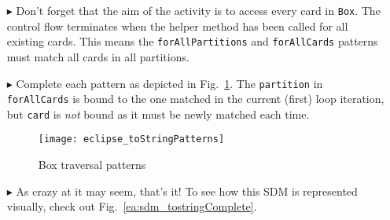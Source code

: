 \begin{itemize}
\item[$\blacktriangleright$] Don't forget that the aim of the activity is to access every card in \texttt{Box}. The control flow terminates when the helper
method has been called for all existing cards. This means the \texttt{forAllPartitions} and \texttt{forAllCards} patterns must match all cards in all
partitions.

\clearpage

\item[$\blacktriangleright$] Complete each pattern as depicted in Fig.~\ref{eclipse:toStringPatterns}. The \texttt{partition} in \texttt{forAllCards} is bound
to the one matched in the current (first) loop iteration, but \texttt{card} is \emph{not} bound as it must be newly matched each time.

\vspace{0.5cm}

\begin{figure}[htp]
\begin{center}
  \texttt{[image: eclipse\_toStringPatterns]}
  \caption{Box traversal patterns}
  \label{eclipse:toStringPatterns}
\end{center}
\end{figure}

\vspace{0.5cm}

\item[$\blacktriangleright$] As crazy at it may seem, that's it!  To see how this SDM is represented visually, check out Fig.~\ref{ea:sdm_tostringComplete}.

\end{itemize}
